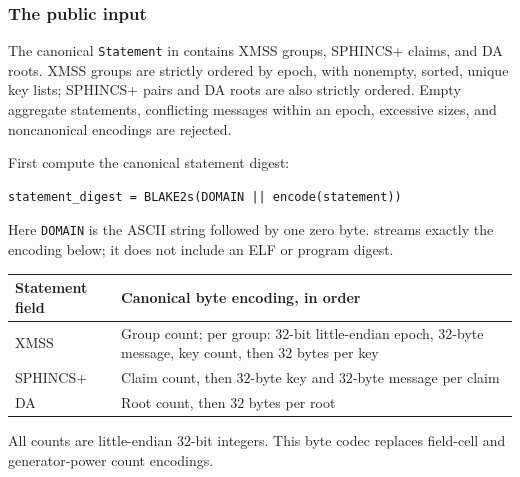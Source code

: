 \subsubsection{The public input}\label{sec:rec-stmt}

The canonical \texttt{Statement} in  contains XMSS groups, SPHINCS+ claims, and DA roots. XMSS groups are strictly ordered by epoch, with nonempty, sorted, unique key lists; SPHINCS+ pairs and DA roots are also strictly ordered. Empty aggregate statements, conflicting messages within an epoch, excessive sizes, and noncanonical encodings are rejected.

First compute the canonical statement digest:
\begin{verbatim}
statement_digest = BLAKE2s(DOMAIN || encode(statement))
\end{verbatim}
Here \texttt{DOMAIN} is the ASCII string  followed by one zero byte.  streams exactly the encoding below; it does not include an ELF or program digest.
\begin{center}
\begin{tabularx}{\textwidth}{@{}lX@{}}
\hline
Statement field & Canonical byte encoding, in order\\
\hline
XMSS & Group count; per group: $32$-bit little-endian epoch, $32$-byte message, key count, then $32$ bytes per key\\
SPHINCS+ & Claim count, then $32$-byte key and $32$-byte message per claim\\
DA & Root count, then $32$ bytes per root\\
\hline
\end{tabularx}
\end{center}
All counts are little-endian $32$-bit integers. This byte codec replaces field-cell and generator-power count encodings.

